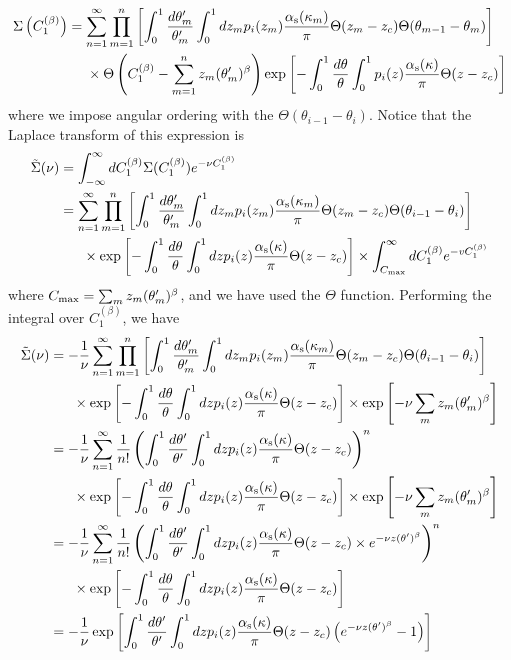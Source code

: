 \begin{align}
    \Sigma\left(C_1^{(\beta)}\right) &= \sum_{n = 1}^\infty \prod_{m = 1}^n \left[\int_0^{1} \frac{d\theta'_m}{\theta'_m}\int_0^1 dz_m p_i(z_m) \frac{\alpha_{\mathrm{s}}(\kappa_m)}{\pi}\Theta(z_m - z_c) \Theta(\theta_{m-1} - \theta_m)\right]
    \\
    &\ \ \ \ \times\Theta\left(C_1^{(\beta)} - \sum_{m=1}^n z_m (\theta'_m)^\beta\right) \exp\left[-\int_0^1\frac{d\theta}{\theta}\int_0^1 p_i(z) \frac{\alpha_{\mathrm{s}}(\kappa)}{\pi}\Theta(z - z_c)\right]
\end{align}
where we impose angular ordering with the \(\Theta(\theta_{i-1} - \theta_i)\). Notice that the Laplace transform of this expression is
\begin{align}
    \tilde\Sigma(\nu) &= \int_{-\infty}^\infty d C_1^{(\beta)} \Sigma(C_1^{(\beta)}) e^{-\nu C_1^{(\beta)}}
    \\
    &= \sum_{n=1}^\infty \prod_{m=1}^n  \left[\int_0^{1} \frac{d\theta'_m}{\theta'_m}\int_0^1 dz_m p_i(z_m) \frac{\alpha_{\mathrm{s}}(\kappa_m)}{\pi}\Theta(z_m - z_c) \Theta(\theta_{i-1} - \theta_i)\right]\\
    &\ \ \ \ \ \times \exp\left[-\int_0^1\frac{d\theta}{\theta}\int_0^1 dz p_i(z) \frac{\alpha_{\mathrm{s}}(\kappa)}{\pi}\Theta(z - z_c)\right] \times\int^\infty_{C_{\rm max}} dC_1^{(\beta)} e^{-v C_1^{(\beta)}}
\end{align}
where \(C_{\rm max} = \sum_m z_m (\theta'_m)^\beta\), and we have used the \(\Theta\) function. Performing the integral over \(C_1^{(\beta)}\), we have
\begin{align}
    \tilde\Sigma(\nu) &= -\frac{1}{\nu} \sum_{n=1}^\infty \prod_{m=1}^n  \left[\int_0^{1} \frac{d\theta'_m}{\theta'_m}\int_0^1 dz_m p_i(z_m) \frac{\alpha_{\mathrm{s}}(\kappa_m)}{\pi}\Theta(z_m - z_c) \Theta(\theta_{i-1} - \theta_i)\right]\\
    &\ \ \ \ \ \times \exp\left[-\int_0^1\frac{d\theta}{\theta}\int_0^1 dz p_i(z) \frac{\alpha_{\mathrm{s}}(\kappa)}{\pi}\Theta(z - z_c)\right] \times \exp\left[ -\nu \sum_m z_m(\theta'_m)^\beta\right]
    \\
    &= -\frac{1}{\nu} \sum_{n=1}^\infty \frac{1}{n!}\left(\int_0^{1} \frac{d\theta'}{\theta'}\int_0^1 dz p_i(z) \frac{\alpha_{\mathrm{s}}(\kappa)}{\pi}\Theta(z - z_c) \right)^n\\
    &\ \ \ \ \ \times \exp\left[-\int_0^1\frac{d\theta}{\theta}\int_0^1 dz p_i(z) \frac{\alpha_{\mathrm{s}}(\kappa)}{\pi}\Theta(z - z_c)\right] \times \exp\left[ -\nu \sum_m z_m(\theta'_m)^\beta\right]
    \\
    &= -\frac{1}{\nu} \sum_{n=1}^\infty \frac{1}{n!}\left(\int_0^{1} \frac{d\theta'}{\theta'}\int_0^1 dz p_i(z) \frac{\alpha_{\mathrm{s}}(\kappa)}{\pi}\Theta(z - z_c) \times e^{-\nu z (\theta')^\beta}\right)^n\\
    &\ \ \ \ \ \times \exp\left[-\int_0^1\frac{d\theta}{\theta}\int_0^1 dz p_i(z) \frac{\alpha_{\mathrm{s}}(\kappa)}{\pi}\Theta(z - z_c)\right]
    \\
    &=  -\frac{1}{\nu} \exp\left[\int_0^{1} \frac{d\theta'}{\theta'}\int_0^1 dz p_i(z) \frac{\alpha_{\mathrm{s}}(\kappa)}{\pi}\Theta(z - z_c) \left( e^{-\nu z (\theta')^\beta} - 1 \right)\right]
\end{align}
